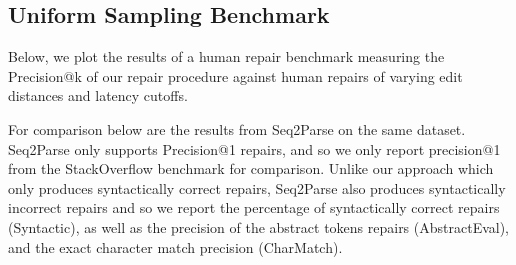 \documentclass[sigplan,review,anonymous,acmsmall]{acmart}\settopmatter{printfolios=false,printccs=false,printacmref=false}
\begin{document}
\subsection{Uniform Sampling Benchmark}\label{sec:human}

Below, we plot the results of a human repair benchmark measuring the Precision@k of our repair procedure against human repairs of varying edit distances and latency cutoffs.%

\begin{figure}[H]

\end{figure}

\begin{figure}[H]

\end{figure}

\begin{figure}[H]

\end{figure}

For comparison below are the results from Seq2Parse on the same dataset. Seq2Parse only supports Precision@1 repairs, and so we only report precision@1 from the StackOverflow benchmark for comparison. Unlike our approach which only produces syntactically correct repairs, Seq2Parse also produces syntactically incorrect repairs and so we report the percentage of syntactically correct repairs (Syntactic), as well as the precision of the abstract tokens repairs (AbstractEval), and the exact character match precision (CharMatch).
\end{document}

